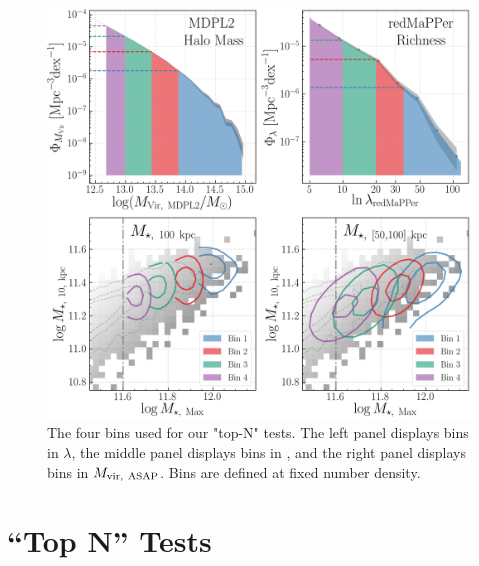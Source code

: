 \documentclass[a4paper,fleqn,usenatbib]{mnras}
\begin{document}
  \begin{figure}
      \centering 
      \includegraphics[width=\textwidth]{figure/topn_bins}
      \caption{The four bins used for our "top-N" tests. The left panel displays bins in
        $\lambda$, the middle panel displays bins in \mmax{}, and the right panel displays bins in
        $M_{\rm vir,\ ASAP}$. Bins are defined at fixed number density. }
      \label{fig:density_bins}
  \end{figure}

\section{``Top N'' Tests}
    \label{sec:topn_intro}   
\end{document}
